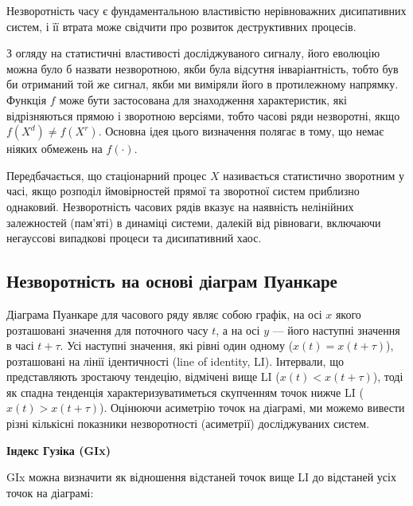 \documentclass[
  letterpaper,
]{report}
\begin{document}
Незворотність часу є фундаментальною властивістю нерівноважних
дисипативних систем, і її втрата може свідчити про розвиток
деструктивних процесів.

З огляду на статистичні властивості досліджуваного сигналу, його
еволюцію можна було б назвати незворотною, якби була відсутня
інваріантність, тобто був би отриманий той же сигнал, якби ми виміряли
його в протилежному напрямку. Функція \(f\) може бути застосована для
знаходження характеристик, які відрізняються прямою і зворотною
версіями, тобто часові ряди незворотні, якщо \(f(X^d) \neq f(X^r)\).
Основна ідея цього визначення полягає в тому, що немає ніяких обмежень
на \(f(\cdot )\).

Передбачається, що стаціонарний процес \(X\) називається статистично
зворотним у часі, якщо розподіл ймовірностей прямої та зворотної систем
приблизно однаковий. Незворотність часових рядів вказує на наявність
нелінійних залежностей (пам'яті) в динаміці системи, далекій від
рівноваги, включаючи негауссові випадкові процеси та дисипативний хаос.

\hypertarget{ux43dux435ux437ux432ux43eux440ux43eux442ux43dux456ux441ux442ux44c-ux43dux430-ux43eux441ux43dux43eux432ux456-ux434ux456ux430ux433ux440ux430ux43c-ux43fux443ux430ux43dux43aux430ux440ux435}{%
\subsection{Незворотність на основі діаграм
Пуанкаре}\label{ux43dux435ux437ux432ux43eux440ux43eux442ux43dux456ux441ux442ux44c-ux43dux430-ux43eux441ux43dux43eux432ux456-ux434ux456ux430ux433ux440ux430ux43c-ux43fux443ux430ux43dux43aux430ux440ux435}}

Діаграма Пуанкаре для часового ряду являє собою графік, на осі \(x\)
якого розташовані значення для поточного часу \(t\), а на осі \(y\) ---
його наступні значення в часі \(t+\tau\). Усі наступні значення, які
рівні один одному (\(x(t) = x(t+\tau)\)), розташовані на лінії
ідентичності (line of identity, LI). Інтервали, що представляють
зростаючу тендецію, відмічені вище LI (\(x(t)<x(t+\tau)\)), тоді як
спадна тенденція характеризуватиметься скупченням точок нижче LI
(\(x(t)>x(t+\tau)\)). Оцінюючи асиметрію точок на діаграмі, ми можемо
вивести різні кількісні показники незворотності (асиметрії)
досліджуваних систем.

\textbf{Індекс Гузіка (GIx)}

GIx можна визначити як відношення відстаней точок вище LI до відстаней
усіх точок на діаграмі:
\end{document}
